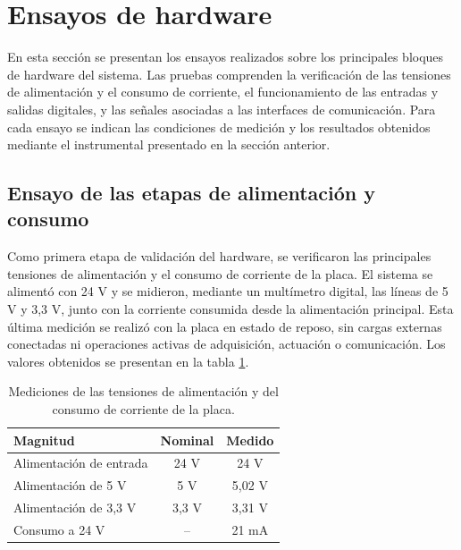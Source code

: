\section{Ensayos de hardware}

En esta sección se presentan los ensayos realizados sobre los principales bloques de hardware del sistema. Las pruebas comprenden la verificación de las tensiones de alimentación y el consumo de corriente, el funcionamiento de las entradas y salidas digitales, y las señales asociadas a las interfaces de comunicación. Para cada ensayo se indican las condiciones de medición y los resultados obtenidos mediante el instrumental presentado en la sección anterior.

\subsection{Ensayo de las etapas de alimentación y consumo}

Como primera etapa de validación del hardware, se verificaron las principales tensiones de alimentación y el consumo de corriente de la placa. El sistema se alimentó con 24 V y se midieron, mediante un multímetro digital, las líneas de 5 V y 3,3 V, junto con la corriente consumida desde la alimentación principal. Esta última medición se realizó con la placa en estado de reposo, sin cargas externas conectadas ni operaciones activas de adquisición, actuación o comunicación. Los valores obtenidos se presentan en la tabla \ref{tab:alimentacion_consumo}.

\begin{table}[h]
	\centering
	\caption[Mediciones de alimentación y consumo]{Mediciones de las tensiones de alimentación y del consumo de corriente de la placa.}
	\begin{tabular}{l c c}
		\toprule
		\textbf{Magnitud} & \textbf{Nominal} & \textbf{Medido} \\
		\midrule
		Alimentación de entrada & 24 V  & 24 V \\
		Alimentación de 5 V     & 5 V   & 5,02 V \\
		Alimentación de 3,3 V   & 3,3 V & 3,31 V \\
		Consumo a 24 V          & --    & 21 mA \\
		\bottomrule
	\end{tabular}
	\label{tab:alimentacion_consumo}
\end{table}


